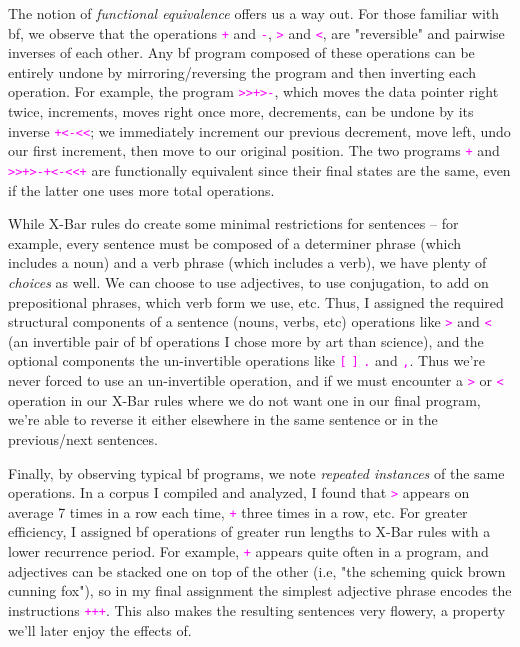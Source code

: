 \documentclass[runningheads]{llncs}
\newcommand{\code}[1]{\texttt{\textcolor{magenta}{\setlength{\fboxsep}{1pt}\colorbox{lightgray!20}{#1}}}}
\begin{document}
The notion of \textit{functional equivalence} offers us a way out. For those familiar with bf, we observe that the operations \code{+} and \code{-}, \code{>} and \code{<}, are "reversible" and pairwise inverses of each other. Any bf program composed of these operations can be entirely undone by mirroring/reversing the program and then inverting each operation. For example, the program \code{>>+>-}, which moves the data pointer right twice, increments, moves right once more, decrements, can be undone by its inverse \code{+<-<<}; we immediately increment our previous decrement, move left, undo our first increment, then move to our original position. The two programs \code{+} and \code{>>+>-+<-<<+} are functionally equivalent since their final states are the same, even if the latter one uses more total operations.

While X-Bar rules do create some minimal restrictions for sentences -- for example, every sentence must be composed of a determiner phrase (which includes a noun) and a verb phrase (which includes a verb), we have plenty of \textit{choices} as well. We can choose to use adjectives, to use conjugation, to add on prepositional phrases, which verb form we use, etc. Thus, I assigned the required structural components of a sentence (nouns, verbs, etc) operations like \code{>} and \code{<} (an invertible pair of bf operations I chose more by art than science), and the optional components the un-invertible operations like \code{[} \code{]} \code{.} and \code{,}. Thus we're never forced to use an un-invertible operation, and if we must encounter a \code{>} or \code{<} operation in our X-Bar rules where we do not want one in our final program, we're able to reverse it either elsewhere in the same sentence or in the previous/next sentences.

Finally, by observing typical bf programs, we note \textit{repeated instances} of the same operations. In a corpus I compiled and analyzed, I found that \code{>} appears on average 7 times in a row each time, \code{+} three times in a row, etc. For greater efficiency, I assigned bf operations of greater run lengths to X-Bar rules with a lower recurrence period. For example, \code{+} appears quite often in a program, and adjectives can be stacked one on top of the other (i.e, "the scheming quick brown cunning fox"), so in my final assignment the simplest adjective phrase encodes the instructions \code{+++}. This also makes the resulting sentences very flowery, a property we'll later enjoy the effects of.
\end{document}
